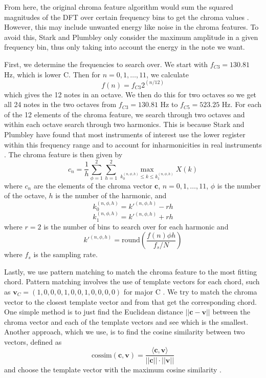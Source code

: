 \documentclass[journal]{IEEEtran}
\begin{document}
From here, the original chroma feature algorithm would sum the squared magnitudes of the DFT over certain frequency bins to get the chroma values \cite{fujishima}. However, this may include unwanted energy like noise in the chroma features. To avoid this, Stark and Plumbley only consider the maximum amplitude in a given frequency bin, thus only taking into account the energy in the note we want.

First, we determine the frequencies to search over. We start with $f_{C3} = 130.81$ Hz, which is lower C. Then for $n = 0, 1, \ldots, 11$, we calculate
\begin{equation}
    f(n) = f_{C3}2^{(n / 12)}
    \label{eq:freq}
\end{equation}
which gives the 12 notes in an octave. We then do this for two octaves so we get all 24 notes in the two octaves from $f_{C3} = 130.81$ Hz to $f_{C5} = 523.25$ Hz. For each of the 12 elements of the chroma feature, we search through two octaves and within each octave search through two harmonics. This is because Stark and Plumbley have found that most instruments of interest use the lower register within this frequency range and to account for inharmonicities in real instruments \cite{stark}. The chroma feature is then given by
\begin{equation}
    c_n = \frac{1}{h}\sum_{\phi = 1}^2\sum_{h = 1}^2 \max_{k_0^{(n, \phi, h)} \leq k \leq k_1^{(n, \phi, h)}} X(k)
    \label{eq:chroma}
\end{equation}
where $c_n$ are the elements of the chroma vector $\mathbf{c}$, $n = 0, 1, \ldots, 11$, $\phi$ is the number of the octave, $h$ is the number of the harmonic, and 
\begin{equation*}
    k_0^{(n, \phi, h)} = k'^{(n, \phi, h)} - rh
\end{equation*}
\begin{equation*}
    k_1^{(n, \phi, h)} = k'^{(n, \phi, h)} + rh
\end{equation*}
where $r = 2$ is the number of bins to search over for each harmonic and 
\begin{equation*}
    k'^{(n, \phi, h)} = \text{round}\!\left(\frac{f(n)\phi h}{f_s / N}\right)
\end{equation*}
where $f_s$ is the sampling rate.

Lastly, we use pattern matching to match the chroma feature to the most fitting chord. Pattern matching involves the use of template vectors for each chord, such as $\mathbf{v}_C = (1, 0, 0, 0, 1, 0, 0, 1, 0, 0, 0, 0)$ for major C \cite{jiang}. We try to match the chroma vector to the closest template vector and from that get the corresponding chord. One simple method is to just find the Euclidean distance $||\mathbf{c} - \mathbf{v}||$ between the chroma vector and each of the template vectors and see which is the smallest. Another approach, which we use,  is to find the cosine similarity between two vectors, defined as 
\begin{equation}
    \text{cossim}(\mathbf{c}, \mathbf{v}) = \frac{\langle\mathbf{c}, \mathbf{v}\rangle}{||\mathbf{c}|| \cdot ||\mathbf{v}||}
    \label{eq:cossim}
\end{equation}
and choose the template vector with the maximum cosine similarity \cite{jiang}.
\end{document}
